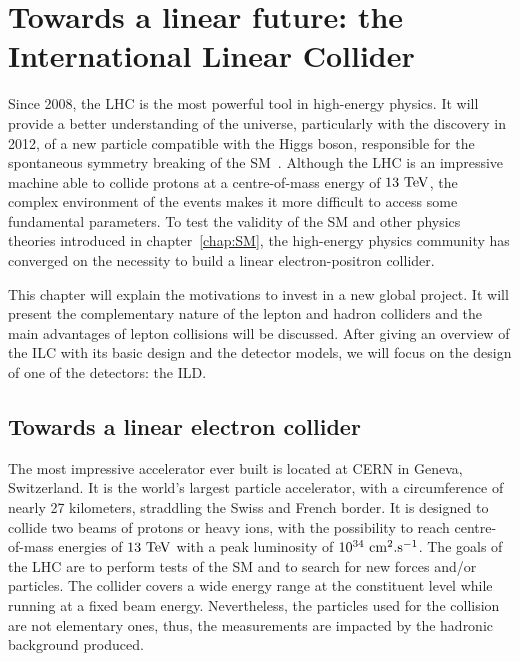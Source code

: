 \chapter{Towards a linear future: the International Linear Collider}
\label{chap:ILC}

  Since 2008, the \gls{LHC} is the most powerful tool in high-energy physics.
  It will provide a better understanding of the universe, particularly with the discovery in 2012, of a new particle compatible with the Higgs boson, responsible for the spontaneous symmetry breaking of the \acrfull{SM}~\cite{Aad2012, Chatrchyan2012}.
  Although the \gls{LHC} is an impressive machine able to collide protons at a centre-of-mass energy of $13~\rm{TeV}$, the complex environment of the events makes it more difficult to access some fundamental parameters. 
  To test the validity of the \gls{SM} and other physics theories introduced in chapter~\ref{chap:SM}, the high-energy physics community has converged on the necessity to build a linear electron-positron collider.
  
  This chapter will explain the motivations to invest in a new global project. 
  It will present the complementary nature of the lepton and hadron colliders and the main advantages of lepton collisions will be discussed.
  After giving an overview of the \gls{ILC} with its basic design and the detector models, we will focus on the design of one of the detectors: the \gls{ILD}.

 \minitoc
  
  \section{Towards a linear electron collider}
 
  The most impressive accelerator ever built is located at \gls{CERN} in Geneva, Switzerland. 
  It is the world's largest particle accelerator, with a circumference of nearly 27 kilometers, straddling the Swiss and French border.
  It is designed to collide two beams of protons or heavy ions, with the possibility to reach centre-of-mass energies of $13~\rm{TeV}$ with a peak luminosity of $10^{34}~\rm{cm}^2\rm{.s}^{-1}$.
  The goals of the \gls{LHC} are to perform tests of the \gls{SM} and to search for new forces and/or particles. 
  The collider covers a wide energy range at the constituent level while running at a fixed beam energy.
  Nevertheless, the particles used for the collision are not elementary ones, thus, the measurements are impacted by the hadronic background produced.
  
